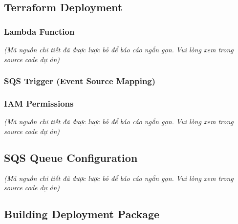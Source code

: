 \hypertarget{terraform-deployment}{%
\subsection{Terraform Deployment}}

\hypertarget{lambda-function}{%
\subsubsection{Lambda Function}}

\emph{(Mã nguồn chi tiết đã được lược bỏ để báo cáo ngắn gọn. Vui lòng
xem trong source code dự án)}

\hypertarget{sqs-trigger-event-source-mapping}{%
\subsubsection{SQS Trigger (Event Source
Mapping)}}

\begin{Shaded}
\begin{Highlighting}[]
\NormalTok{\}}
\end{Highlighting}
\end{Shaded}

\hypertarget{iam-permissions}{%
\subsubsection{IAM Permissions}}

\emph{(Mã nguồn chi tiết đã được lược bỏ để báo cáo ngắn gọn. Vui lòng
xem trong source code dự án)}

\hypertarget{sqs-queue-configuration}{%
\subsection{SQS Queue Configuration}}

\emph{(Mã nguồn chi tiết đã được lược bỏ để báo cáo ngắn gọn. Vui lòng
xem trong source code dự án)}

\hypertarget{building-deployment-package}{%
\subsection{Building Deployment
Package}}

